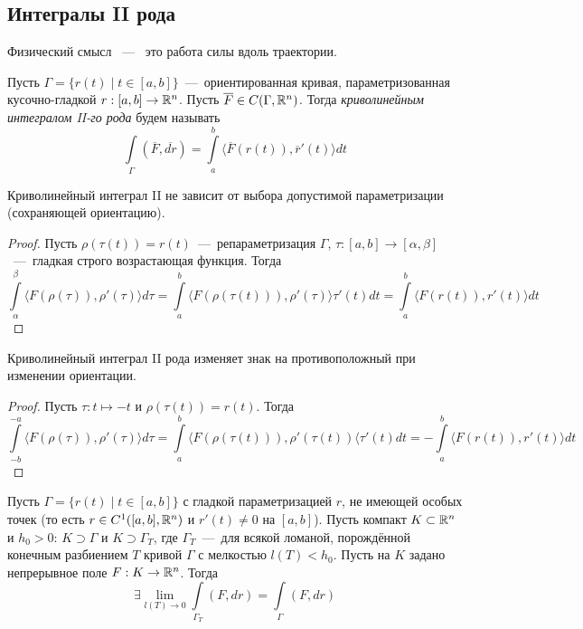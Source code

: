 \subsection{Интегралы II рода}
Физический смысл ~---~ это работа силы вдоль траектории.

\begin{definition}
    Пусть $\Gamma = \{r(t) \mid t \in [a, b]\}$~---~ориентированная кривая, параметризованная кусочно-гладкой $r: [a, b] \rightarrow \mathbb{R}^n$. Пусть $
    \overline{F} \in C(\Gamma, \mathbb{R}^n)$. Тогда \textit{криволинейным интегралом II-го рода} будем называть \[\int\limits_\Gamma (\overline{F}, \overline{dr}) = \int\limits_a^b \langle \overline{F}(r(t)), \overline{r}'(t) \rangle dt\]
\end{definition}
\begin{lemma}
    Криволинейный интеграл II не зависит от выбора допустимой параметризации (сохраняющей ориентацию).
\end{lemma}
\begin{proof}
    Пусть $\rho(\tau(t)) = r(t)$~---~репараметризация $\Gamma$, $\tau: [a, b] \rightarrow [\alpha, \beta]$~---~гладкая строго возрастающая функция. Тогда \[\int\limits_\alpha^\beta \langle F(\rho(\tau)), \rho'(\tau)\rangle d\tau = \int\limits_a^b \langle F(\rho(\tau(t))), \rho'(\tau) \rangle \tau'(t) dt = \int\limits_a^b \langle F(r(t)), r'(t) \rangle dt\]
\end{proof}
\begin{lemma}
    Криволинейный интеграл II рода изменяет знак на противоположный при изменении ориентации.
\end{lemma}
\begin{proof}
    Пусть $\tau: t \mapsto -t$ и $\rho(\tau(t)) = r(t)$. Тогда \[\int\limits_{-b}^{-a} \langle F(\rho(\tau)), \rho'(\tau) \rangle d\tau = \int\limits_a^b \langle F(\rho(\tau(t))), \rho'(\tau(t))\langle \tau'(t) dt = -\int\limits_a^b \langle F(r(t)), r'(t) \rangle dt\]
\end{proof}
\hypertarget{krivaya_lomanaya}{}
\begin{lemma}
    Пусть $\Gamma = \{r(t) \mid t \in [a, b]\}$ с гладкой параметризацией $r$, не имеющей особых точек (то есть $r \in C^1([a, b], \mathbb{R}^n)$ и $r'(t) \neq 0$ на $[a, b]$). Пусть компакт $K \subset \mathbb{R}^n$ и $h_0 > 0$: $K \supset \Gamma$ и $K \supset \Gamma_T$, где $\Gamma_T$~---~для всякой ломаной, порождённой конечным разбиением $T$ кривой $\Gamma$ с мелкостью $l(T) < h_0$. Пусть на $K$ задано непрерывное поле $F: K \rightarrow \mathbb{R}^n$. Тогда \[\exists \lim\limits_{l(T) \rightarrow 0} \int\limits_{\Gamma_T} (F, dr) = \int\limits_\Gamma (F, dr)\]
\end{lemma}
